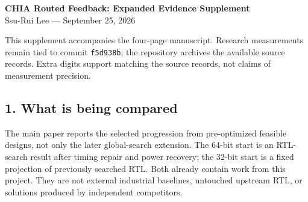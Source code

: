 \documentclass[10pt]{article}
\newcommand{\sect}[1]{\subsection*{#1}}
\begin{document}
\begin{center}{\Large\bfseries CHIA Routed Feedback: Expanded Evidence Supplement}\\[4pt]
Ssu-Rui Lee --- September 25, 2026\end{center}
This supplement accompanies the four-page manuscript. Research measurements remain tied to commit \texttt{f5d938b}; the repository archives the available source records. Extra digits support matching the source records, not claims of measurement precision.
\sect{1. What is being compared}
The main paper reports the selected progression from pre-optimized feasible designs, not only the later global-search extension. The 64-bit start is an RTL-search result after timing repair and power recovery; the 32-bit start is a fixed projection of previously searched RTL. Both already contain work from this project. They are not external industrial baselines, untouched upstream RTL, or solutions produced by independent competitors.
\end{document}
